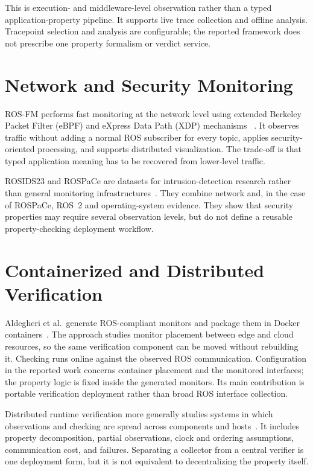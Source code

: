 This is execution- and middleware-level observation rather than a typed
application-property pipeline. It supports live trace collection and offline
analysis. Tracepoint selection and analysis are configurable; the reported
framework does not prescribe one property formalism or verdict service.

\section{Network and Security Monitoring}

ROS-FM performs fast monitoring at the network level using extended Berkeley
Packet Filter (eBPF) and eXpress Data Path (XDP) mechanisms
~\cite{rivera2020rosfm}. It observes traffic without adding a normal ROS
subscriber for every topic, applies security-oriented processing, and supports
distributed visualization. The trade-off is that typed application meaning has
to be recovered from lower-level traffic.

ROSIDS23 and ROSPaCe are datasets for intrusion-detection research rather than
general monitoring infrastructures~\cite{degirmenci2023rosids23,puccetti2024rospace}.
They combine network and, in the case of ROSPaCe, ROS~2 and operating-system
evidence. They show that security properties may require several observation
levels, but do not define a reusable property-checking deployment workflow.

\section{Containerized and Distributed Verification}

Aldegheri et al.\ generate ROS-compliant monitors and package them in Docker
containers~\cite{aldegheri2021containerized}. The approach studies monitor
placement between edge and cloud resources, so the same verification component
can be moved without rebuilding it. Checking runs online against the observed
ROS communication. Configuration in the reported work concerns container
placement and the monitored interfaces; the property logic is fixed inside the
generated monitors. Its main contribution is portable verification deployment
rather than broad ROS interface collection.

Distributed runtime verification more generally studies systems in which
observations and checking are spread across components and
hosts~\cite{francalanza2018distributed}. It includes property decomposition,
partial observations, clock and ordering assumptions, communication cost, and
failures. Separating a collector from a central verifier is one deployment
form, but it is not equivalent to decentralizing the property itself.


